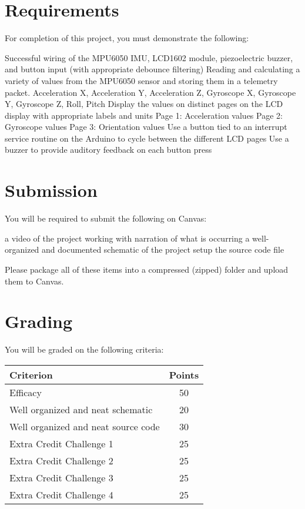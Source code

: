 \section*{Requirements} 
For completion of this project, you must demonstrate the following:
\begin{outline}
    \1 Successful wiring of the MPU6050 IMU, LCD1602 module, piezoelectric buzzer, and button input (with appropriate debounce filtering)
    \1 Reading and calculating a variety of values from the MPU6050 sensor and storing them in a telemetry packet.
        \2 Acceleration X,
        \2 Acceleration Y,
        \2 Acceleration Z,
        \2 Gyroscope X,
        \2 Gyroscope Y,
        \2 Gyroscope Z,
        \2 Roll,
        \2 Pitch
    \1 Display the values on distinct pages on the LCD display with appropriate labels and units
        \2 Page 1: Acceleration values
        \2 Page 2: Gyroscope values
        \2 Page 3: Orientation values
    \1 Use a button tied to an interrupt service routine on the Arduino to cycle between the different LCD pages
    \2 Use a buzzer to provide auditory feedback on each button press 
\end{outline}

\section*{Submission}
You will be required to submit the following on Canvas:
\begin{outline}
    \1 a video of the project working with narration of what is occurring
    \1 a well-organized and documented schematic of the project setup
    \1 the source code file
\end{outline}
Please package all of these items into a compressed (zipped) folder and upload them to Canvas.

\section*{Grading} 
You will be graded on the following criteria:
\begin{table}[h!]
    \begin{tabular}{l | c}
        \toprule
        Criterion & Points \\

        \midrule
        Efficacy & 50 \\
        Well organized and neat schematic & 20 \\
        Well organized and neat source code & 30 \\
        Extra Credit Challenge 1 \footnotemark & 25 \\
        Extra Credit Challenge 2 & 25 \\
        Extra Credit Challenge 3 & 25 \\
        Extra Credit Challenge 4 & 25 \\

        \bottomrule
    \end{tabular}
\end{table}


